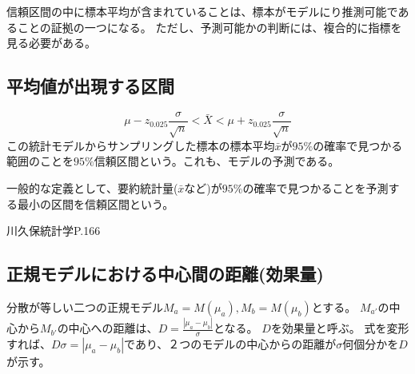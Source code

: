 信頼区間の中に標本平均が含まれていることは、標本がモデルにり推測可能であることの証拠の一つになる。
ただし、予測可能かの判断には、複合的に指標を見る必要がある。

\subsection{平均値が出現する区間}
\begin{equation*}
    \mu - z_{0.025} \frac{\sigma}{\sqrt{n}} < \bar{X} < \mu + z_{0.025} \frac{\sigma}{\sqrt{n}}
\end{equation*}
この統計モデルからサンプリングした標本の標本平均$\bar{x}$が$95\%$の確率で見つかる範囲のことを$95\%$信頼区間という。これも、モデルの予測である。

一般的な定義として、要約統計量($\bar{x}$など)が$95\%$の確率で見つかることを予測する最小の区間を信頼区間という。

\fi

 川久保統計学P.166
 \fi







\subsection{正規モデルにおける中心間の距離(効果量)}
分散が等しい二つの正規モデル$M_a=M(\mu_a),M_b=M(\mu_b)$とする。
$M_{a'}$の中心から$M_{b'}$の中心への距離は、$D=\frac{|\mu_a-\mu_b|}{\sigma}$となる。
$D$を効果量と呼ぶ。
式を変形すれば、$D\sigma = |\mu_a-\mu_b|$であり、２つのモデルの中心からの距離が$\sigma$何個分かを$D$が示す。



